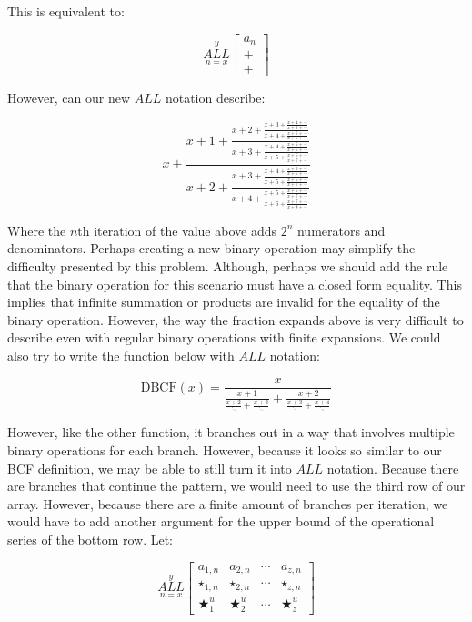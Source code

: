 \documentclass{article}
\begin{document}
This is equivalent to:

$$\underset{n=x}{\overset{y}{ALL}}
\begin{bmatrix}
a_n \\ + \\ + \end{bmatrix}$$

However, can our new $ALL$ notation describe:

$$x+\frac{x+1+\frac{x+2+\frac{x+3+\frac{x+4+\cdots}{x+5+\cdots}}{x+4+\frac{x+5+\cdots}{x+6+\cdots}}}{x+3+\frac{x+4+\frac{x+5+\cdots}{x+6+\cdots}}{x+5+\frac{x+6+\cdots}{x+7+\cdots}}}}{x+2+\frac{x+3+\frac{x+4+\frac{x+5+\cdots}{x+6+\cdots}}{x+5+\frac{x+6+\cdots}{x+7+\cdots}}}{x+4+\frac{x+5+\frac{x+6+\cdots}{x+7+\cdots}}{x+6+\frac{x+7+\cdots}{x+8+\cdots}}}}$$

Where the $n$th iteration of the value above adds $2^n$ numerators and denominators. Perhaps creating a new binary operation may simplify the difficulty presented by this problem. Although, perhaps we should add the rule that the binary operation for this scenario must have a closed form equality. This implies that infinite summation or products are invalid for the equality of the binary operation. However, the way the fraction expands above is very difficult to describe even with regular binary operations with finite expansions. We could also try to write the function below with $ALL$ notation:

$$\text{DBCF}(x)=\frac{x}{\frac{x+1}{\frac{x+2}{\ddots}+\frac{x+3}{\ddots}}+\frac{x+2}{\frac{x+3}{\ddots}+\frac{x+4}{\ddots}}}$$

However, like the other function, it branches out in a way that involves multiple binary operations for each branch. However, because it looks so similar to our BCF definition, we may be able to still turn it into $ALL$ notation. Because there are branches that continue the pattern, we would need to use the third row of our array. However, because there are a finite amount of branches per iteration, we would have to add another argument for the upper bound of the operational series of the bottom row. Let:

$$\underset{n=x}{\overset{y}{ALL}}
\begin{bmatrix}
a_{1,n} & a_{2,n} & \cdots & a_{z,n} \\
\star_{1,n} & \star_{2,n} & \cdots & \star_{z,n} \\ \bigstar_{1}^u & \bigstar_{2}^u & \cdots & \bigstar_{z}^u
\end{bmatrix}$$
\end{document}
